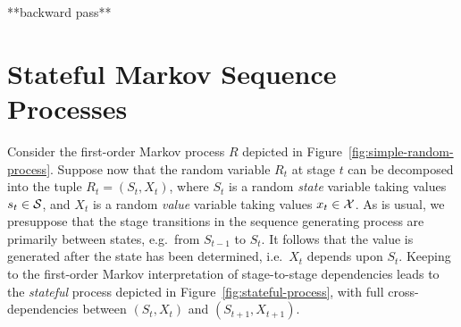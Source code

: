 \documentclass[a4paper]{article}
\begin{document}
**backward pass**

\section{Stateful Markov Sequence Processes}
Consider the first-order Markov process $R$ depicted in Figure~\ref{fig:simple-random-process}.
Suppose now that the random variable $R_t$ at stage $t$ can be decomposed into the tuple
$R_t=(S_t,X_t)$, where $S_t$ is a random {\em state} variable taking values $s_t\in{\cal S}$, and $X_t$
is a random {\em value} variable taking values $x_t\in{\cal X}$.
As is usual, we presuppose that the stage transitions in the sequence generating process are primarily between states, e.g.\ from $S_{t-1}$ to $S_t$.
It follows that the value is generated after the state has been determined, i.e.\ $X_t$ depends upon $S_t$.
Keeping to the first-order Markov interpretation of stage-to-stage dependencies leads to
the {\em stateful} process depicted in Figure~\ref{fig:stateful-process}, with full cross-dependencies between $(S_t,X_t)$ and
$(S_{t+1},X_{t+1})$.
\end{document}

